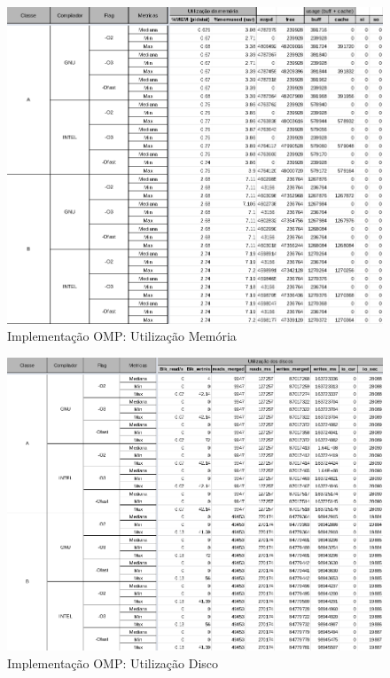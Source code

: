 \documentclass{article}
\begin{document}
\begin{appendices}
\begin{figure}[H]
    \centering
    \includegraphics[width=12cm]{Pictures/LUMZ_r431_OMP_MEM.png}
    \caption{Implementação OMP: Utilização Memória}
    \label{figure:LUMZ_r431_OMP_MEM}
\end{figure}

\begin{figure}[H]
    \centering
    \includegraphics[width=12cm]{Pictures/LUMZ_r431_OMP_DISK.png}
    \caption{Implementação OMP: Utilização Disco}
    \label{figure:LUMZ_r431_OMP_DISK}
\end{figure}


\end{appendices}
\end{document}

